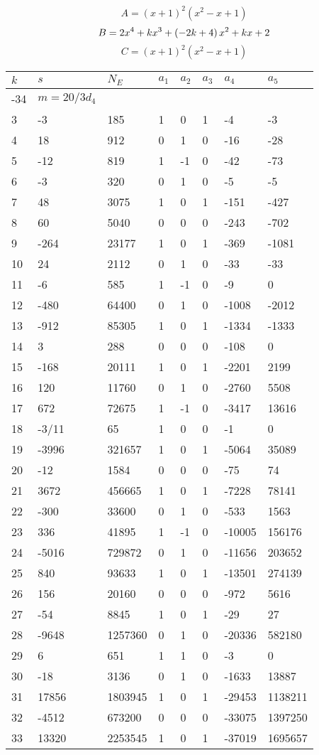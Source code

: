 \documentclass{amsart}
\begin{document}
$$A=(x
 + 1)^{2}(x^2
 - x
 + 1)$$
$$B=2\*x^4
 + k\*x^3
 + \left(-2\*k
 + 4\right) \*x^2
 + k\*x
 + 2$$
$$C=(x
 + 1)^{2}(x^2
 - x
 + 1)$$
\begin{longtable}{|l|l|l|lllll|}
\hline
$k$ & $s$ & $N_E$ & $a_1$ & $a_2$ & $a_3$ & $a_4$ & $a_5$\\
\hline
-34&$m=20/3d_{4}$&&\multicolumn{5}{c|}{}\\
3&-3&185&1&0&1&-4&-3\\
4&18&912&0&1&0&-16&-28\\
5&-12&819&1&-1&0&-42&-73\\
6&-3&320&0&1&0&-5&-5\\
7&48&3075&1&0&1&-151&-427\\
8&60&5040&0&0&0&-243&-702\\
9&-264&23177&1&0&1&-369&-1081\\
10&24&2112&0&1&0&-33&-33\\
11&-6&585&1&-1&0&-9&0\\
12&-480&64400&0&1&0&-1008&-2012\\
13&-912&85305&1&0&1&-1334&-1333\\
14&3&288&0&0&0&-108&0\\
15&-168&20111&1&0&1&-2201&2199\\
16&120&11760&0&1&0&-2760&5508\\
17&672&72675&1&-1&0&-3417&13616\\
18&-3/11&65&1&0&0&-1&0\\
19&-3996&321657&1&0&1&-5064&35089\\
20&-12&1584&0&0&0&-75&74\\
21&3672&456665&1&0&1&-7228&78141\\
22&-300&33600&0&1&0&-533&1563\\
23&336&41895&1&-1&0&-10005&156176\\
24&-5016&729872&0&1&0&-11656&203652\\
25&840&93633&1&0&1&-13501&274139\\
26&156&20160&0&0&0&-972&5616\\
27&-54&8845&1&0&1&-29&27\\
28&-9648&1257360&0&1&0&-20336&582180\\
29&6&651&1&1&0&-3&0\\
30&-18&3136&0&1&0&-1633&13887\\
31&17856&1803945&1&0&1&-29453&1138211\\
32&-4512&673200&0&0&0&-33075&1397250\\
33&13320&2253545&1&0&1&-37019&1695657\\

\end{longtable}
\end{document}
